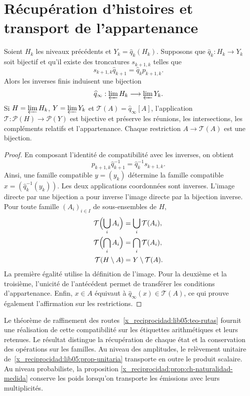 \section{Récupération d'histoires et transport de l'appartenance}
\begin{proposition}
\label{x_reciprocidad:lib07:prop-familias}
Soient \(H_k\) les niveaux précédents et \(Y_k=\widehat q_k(H_k)\).
Supposons que \(\widehat q_k:H_k\to Y_k\) soit bijectif et qu’il existe
des troncatures \(s_{k+1,k}\) telles que
\[
 s_{k+1,k}\widehat q_{k+1}=\widehat q_k p_{k+1,k}.
\]
Alors les inverses finis induisent une bijection
\[
 \widehat q_\infty:\varprojlim H_k\longrightarrow\varprojlim Y_k.
\]
Si \(H=\varprojlim H_k\), \(Y=\varprojlim Y_k\) et \(\mathcal T(A)=\widehat q_\infty[A]\), l'application \(\mathcal T:\mathcal P(H)\to\mathcal P(Y)\) est bijective et préserve les réunions, les intersections, les compléments relatifs et l'appartenance. Chaque restriction \(A\to\mathcal T(A)\) est une bijection.
\end{proposition}
\begin{proof}
En composant l’identité de compatibilité avec les inverses, on obtient
\[
 p_{k+1,k}\widehat q_{k+1}^{-1}
   =\widehat q_k^{-1}s_{k+1,k}.
\]
Ainsi, une famille compatible \(y=(y_k)\) détermine la famille
compatible \(x=(\widehat q_k^{-1}(y_k))\). Les deux applications
coordonnées sont inverses. L’image directe par une bijection a
pour inverse l’image directe par la bijection inverse. Pour toute
famille \((A_i)_{i\in I}\) de sous-ensembles de \(H\),
\[
 \begin{aligned}
 \mathcal T\Bigl(\bigcup_i A_i\Bigr)&=\bigcup_i\mathcal T(A_i),\\
 \mathcal T\Bigl(\bigcap_i A_i\Bigr)&=\bigcap_i\mathcal T(A_i),\\
 \mathcal T(H\setminus A)&=Y\setminus\mathcal T(A).
 \end{aligned}
\]
La première égalité utilise la définition de l'image. Pour la deuxième et la troisième, l'unicité de l'antécédent permet de transférer les conditions d'appartenance. Enfin, \(x\in A\) équivaut à \(\widehat q_\infty(x)\in\mathcal T(A)\), ce qui prouve également l'affirmation sur les restrictions.
\end{proof}

Le théorème de raffinement des routes~\ref{x_reciprocidad:lib05:teo-rutas}
fournit une réalisation de cette compatibilité sur les étiquettes
arithmétiques et leurs retenues. Le résultat distingue la récupération
de chaque état et la conservation des opérations sur les familles.
Au niveau des amplitudes, le relèvement unitaire
de~\ref{x_reciprocidad:lib05:prop-unitaria} transporte en outre le produit scalaire.
Au niveau probabiliste, la proposition
\ref{x_reciprocidad:prop:ch-naturalidad-medida} conserve les poids lorsqu’on
transporte les émissions avec leurs multiplicités.

